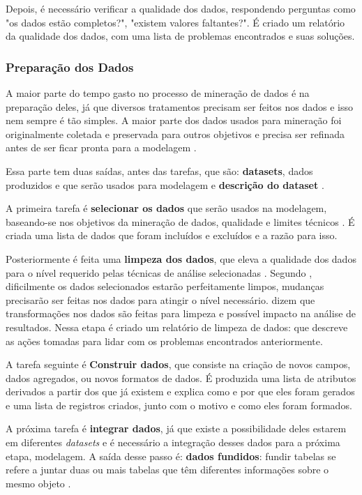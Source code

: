 Depois, é necessário verificar a qualidade dos dados, respondendo perguntas como "os dados estão completos?", "existem valores faltantes?". É criado um relatório da qualidade dos dados, com uma lista de problemas encontrados e suas soluções.

\subsubsection{Preparação dos Dados}
A maior parte do tempo gasto no processo de mineração de dados é na preparação deles, já que diversos tratamentos precisam ser feitos nos dados e isso nem sempre é tão simples. A maior parte dos dados usados para mineração foi originalmente coletada e preservada para outros objetivos e precisa ser refinada antes de ser ficar pronta para a modelagem \citep{dmfd}.

Essa parte tem duas saídas, antes das tarefas, que são: \textbf{datasets}, dados produzidos e que serão usados para modelagem e \textbf{descrição do dataset} \citep{crispmanual}.

A primeira tarefa é \textbf{selecionar os dados} que serão usados na modelagem, baseando-se nos objetivos da mineração de dados, qualidade e limites técnicos \citep{crispmanual}. É criada uma lista de dados que foram incluídos e excluídos e a razão para isso.

Posteriormente é feita uma \textbf{limpeza dos dados}, que eleva a qualidade dos dados para o nível requerido pelas técnicas de análise selecionadas \citep{crispmanual}. Segundo , dificilmente os dados selecionados estarão perfeitamente limpos, mudanças precisarão ser feitas nos dados para atingir o nível necessário.  dizem que transformações nos dados são feitas para limpeza e possível impacto na análise de resultados. Nessa etapa é criado um relatório de limpeza de dados: que descreve as ações tomadas para lidar com os problemas encontrados anteriormente.

A tarefa seguinte é \textbf{Construir dados}, que consiste na criação de novos campos, dados agregados, ou novos formatos de dados. É produzida uma lista de atributos derivados a partir dos que já existem e explica como e por que eles foram gerados e uma lista de registros criados, junto com o motivo e como eles foram formados.

A próxima tarefa é \textbf{integrar dados}, já que existe a possibilidade deles estarem em diferentes \textit{datasets} e é necessário a integração desses dados para a próxima etapa, modelagem. A saída desse passo é: \textbf{dados fundidos}: fundir tabelas se refere a juntar duas ou mais tabelas que têm diferentes informações sobre o mesmo objeto \citep{crispmanual}. 

